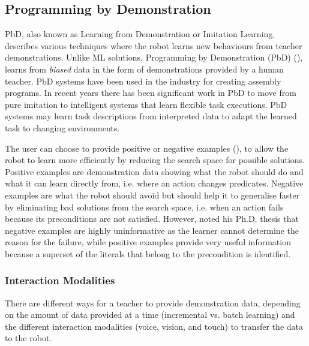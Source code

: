 \subsection{Programming by Demonstration}
PbD, also known as Learning from Demonstration or Imitation Learning, describes various techniques where the robot learns new behaviours from teacher demonstrations. 
Unlike ML solutions, Programming by Demonstration (PbD) (\cite{billard2016learning,argall2009survey}), learns from \textit{biased} data in the form of demonstrations provided by a human teacher.
PbD systems have been used in the industry for creating assembly programs. 
In recent years there has been significant work in PbD to move from pure imitation to intelligent systems that learn flexible task executions. 
PbD systems may learn task descriptions from interpreted data to adapt the learned task to changing environments.

The user can choose to provide positive or negative examples (\cite{grollman2012robot}), to allow the robot to learn more efficiently by reducing the search space for possible solutions.
Positive examples are demonstration data showing what the robot should do and what it can learn directly from, i.e. where an action changes predicates.
Negative examples are what the robot should avoid but should help it to generalise faster by eliminating bad solutions from the search space, i.e. when an action fails because its preconditions are not satisfied.
However, \cite{walsh2010efficient} noted his Ph.D. thesis that negative examples are highly uninformative as the learner cannot determine the reason for the failure, while positive examples provide very useful information because a superset of the literals that belong to the precondition is identified.


\subsubsection{Interaction Modalities}
There are different ways for a teacher to provide demonstration data, depending on the amount of data provided at a time (incremental vs. batch learning) and the different interaction modalities (voice, vision, and touch) to transfer the data to the robot.

